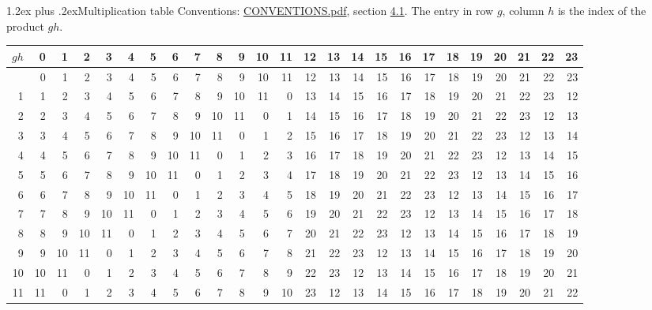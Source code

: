 \documentclass[10pt,a4paper]{article}
\makeatletter
\renewcommand\section{\@startsection{section}{1}{\z@}{-3ex plus -1ex minus -.2ex}%
  {1.2ex plus .2ex}{\normalfont\large\sffamily\bfseries\color{parttitle}}}
\numberwithin{equation}{section}
\makeatother
\begin{document}
\section{Multiplication table}\label{s:multiplication}
Conventions: \href{../../CONVENTIONS.pdf}{CONVENTIONS.pdf}, section \href{../../CONVENTIONS.pdf\#conv.4.1}{4.1}.
The entry in row $g$, column $h$ is the index of the product $gh$.
{\normalsize\setlength{\tabcolsep}{0.1em}\setlength{\LTleft}{-8pt plus 1fill}\setlength{\LTright}{-8pt plus 1fill}\begin{longtable}{@{}r|rrrrrrrrrrrrrrrrrrrrrrrr@{}}\toprule
$gh$ & 0 & 1 & 2 & 3 & 4 & 5 & 6 & 7 & 8 & 9 & 10 & 11 & 12 & 13 & 14 & 15 & 16 & 17 & 18 & 19 & 20 & 21 & 22 & 23\\\midrule\endhead
\bottomrule\endfoot\endlastfoot
0 & 0 & 1 & 2 & 3 & 4 & 5 & 6 & 7 & 8 & 9 & 10 & 11 & 12 & 13 & 14 & 15 & 16 & 17 & 18 & 19 & 20 & 21 & 22 & 23\\*
1 & 1 & 2 & 3 & 4 & 5 & 6 & 7 & 8 & 9 & 10 & 11 & 0 & 13 & 14 & 15 & 16 & 17 & 18 & 19 & 20 & 21 & 22 & 23 & 12\\
2 & 2 & 3 & 4 & 5 & 6 & 7 & 8 & 9 & 10 & 11 & 0 & 1 & 14 & 15 & 16 & 17 & 18 & 19 & 20 & 21 & 22 & 23 & 12 & 13\\
3 & 3 & 4 & 5 & 6 & 7 & 8 & 9 & 10 & 11 & 0 & 1 & 2 & 15 & 16 & 17 & 18 & 19 & 20 & 21 & 22 & 23 & 12 & 13 & 14\\
4 & 4 & 5 & 6 & 7 & 8 & 9 & 10 & 11 & 0 & 1 & 2 & 3 & 16 & 17 & 18 & 19 & 20 & 21 & 22 & 23 & 12 & 13 & 14 & 15\\
5 & 5 & 6 & 7 & 8 & 9 & 10 & 11 & 0 & 1 & 2 & 3 & 4 & 17 & 18 & 19 & 20 & 21 & 22 & 23 & 12 & 13 & 14 & 15 & 16\\
6 & 6 & 7 & 8 & 9 & 10 & 11 & 0 & 1 & 2 & 3 & 4 & 5 & 18 & 19 & 20 & 21 & 22 & 23 & 12 & 13 & 14 & 15 & 16 & 17\\
7 & 7 & 8 & 9 & 10 & 11 & 0 & 1 & 2 & 3 & 4 & 5 & 6 & 19 & 20 & 21 & 22 & 23 & 12 & 13 & 14 & 15 & 16 & 17 & 18\\
8 & 8 & 9 & 10 & 11 & 0 & 1 & 2 & 3 & 4 & 5 & 6 & 7 & 20 & 21 & 22 & 23 & 12 & 13 & 14 & 15 & 16 & 17 & 18 & 19\\
9 & 9 & 10 & 11 & 0 & 1 & 2 & 3 & 4 & 5 & 6 & 7 & 8 & 21 & 22 & 23 & 12 & 13 & 14 & 15 & 16 & 17 & 18 & 19 & 20\\
10 & 10 & 11 & 0 & 1 & 2 & 3 & 4 & 5 & 6 & 7 & 8 & 9 & 22 & 23 & 12 & 13 & 14 & 15 & 16 & 17 & 18 & 19 & 20 & 21\\
11 & 11 & 0 & 1 & 2 & 3 & 4 & 5 & 6 & 7 & 8 & 9 & 10 & 23 & 12 & 13 & 14 & 15 & 16 & 17 & 18 & 19 & 20 & 21 & 22\\

\end{longtable}}
\end{document}
